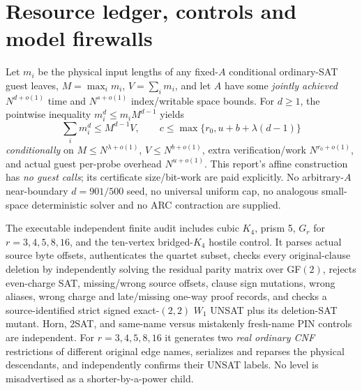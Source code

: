 \documentclass[11pt]{article}
\begin{document}
\section{Resource ledger, controls and model firewalls}
Let $m_i$ be the physical input lengths of any fixed-$A$ conditional ordinary-SAT guest leaves, $M=\max_i m_i$, $V=\sum_i m_i$, and let $A$ have some \emph{jointly achieved} $N^{d+o(1)}$ time and $N^{s+o(1)}$ index/writable space bounds.  For $d\ge1$, the pointwise inequality $m_i^d\le m_iM^{d-1}$ yields
\[
\sum_i m_i^d\le M^{d-1}V,\qquad
c\le\max\{r_0,u+b+\lambda(d-1)\}
\tag{8}
\]
\emph{conditionally} on $M\le N^{\lambda+o(1)}$, $V\le N^{b+o(1)}$, extra verification/work $N^{r_0+o(1)}$, and actual guest per-probe overhead $N^{u+o(1)}$.  This report's affine construction has \emph{no guest calls}; its certificate size/bit-work are paid explicitly.  No arbitrary-$A$ near-boundary $d=901/500$ seed, no universal uniform cap, no analogous small-space deterministic solver and no ARC contraction are supplied.

The executable independent finite audit includes cubic $K_4$, prism 5, $G_r$ for $r=3,4,5,8,16$, and the ten-vertex bridged-\(K_4\) hostile control.  It parses actual source byte offsets, authenticates the quartet subset, checks every original-clause deletion by independently solving the residual parity matrix over GF$(2)$, rejects even-charge SAT, missing/wrong source offsets, clause sign mutations, wrong aliases, wrong charge and late/missing one-way proof records, and checks a source-identified strict signed exact-$(2,2)$ $W_1$ UNSAT plus its deletion-SAT mutant.  Horn, 2SAT, and same-name versus mistakenly fresh-name PIN controls are independent.  For $r=3,4,5,8,16$ it generates two \emph{real ordinary CNF} restrictions of different original edge names, serializes and reparses the physical descendants, and independently confirms their UNSAT labels.  No level is misadvertised as a shorter-by-a-power child.
\end{document}
